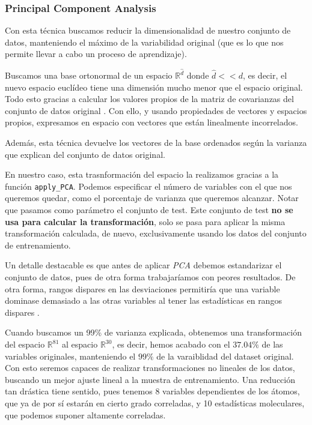 \documentclass[11pt]{article}
\begin{document}
\subsubsection{Principal Component Analysis}

Con esta técnica buscamos reducir la dimensionalidad de nuestro conjunto de datos, manteniendo el máximo de la variabilidad original (que es lo que nos permite llevar a cabo un proceso de aprendizaje).

Buscamos una base ortonormal de un espacio $\mathbb{R}^{\hat{d}}$ donde $\hat{d} << d$, es decir, el nuevo espacio euclídeo tiene una dimensión mucho menor que el espacio original. Todo esto gracias a calcular los valores propios de la matriz de covarianzas del conjunto de datos original \cite{pca_wikipedia:online} \cite{pca_article:online}. Con ello, y usando propiedades de vectores y espacios propios, expresamos en espacio con vectores que están linealmente incorrelados.

Además, esta técnica devuelve los vectores de la base ordenados según la varianza que explican del conjunto de datos original.

En nuestro caso, esta trasnformación del espacio la realizamos gracias a la función \lstinline{apply_PCA}. Podemos especificar el número de variables con el que nos queremos quedar, como el porcentaje de varianza que queremos alcanzar. Notar que pasamos como parámetro el conjunto de test. Este conjunto de test \textbf{no se usa para calcular la transformación}, solo se pasa para aplicar la misma transformación calculada, de nuevo, exclusivamente usando los datos del conjunto de entrenamiento.

Un detalle destacable es que antes de aplicar \emph{PCA} debemos estandarizar el conjunto de datos, pues de otra forma trabajaríamos con peores resultados. De otra forma, rangos dispares en las desviaciones permitiría que una variable dominase demasiado a las otras variables al tener las estadísticas en rangos dispares \cite{normalize_before_pca:online}.

Cuando buscamos un 99\% de varianza explicada, obtenemos una transformación del espacio $\mathbb{R}^{81}$ al espacio $\mathbb{R}^{30}$, es decir, hemos acabado con el $37.04\%$ de las variables originales, manteniendo el $99\%$ de la varaiblidad del dataset original. Con esto seremos capaces de realizar transformaciones no lineales de los datos, buscando un mejor ajuste lineal a la muestra de entrenamiento. Una reducción tan drástica tiene sentido, pues tenemos 8 variables dependientes de los átomos, que ya de por sí estarán en cierto grado correladas, y 10 estadísticas moleculares, que podemos suponer altamente correladas.
\end{document}
